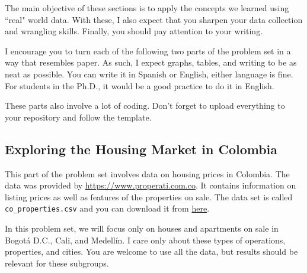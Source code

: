 \documentclass[12pt,onecolumn]{article}
\begin{document}
The main objective of these sections is to apply the concepts we learned using ``real" world data. With these, I also expect that you sharpen your data collection and wrangling skills. Finally, you should pay attention to your writing.

I encourage you to turn each of the following two parts of the problem set in a way that resembles paper. As such, I expect graphs, tables, and writing to be as neat as possible. You can write it in Spanish or English, either language is fine. For students in the Ph.D., it would be a good practice to do it in English.

These parts also involve a lot of coding. Don't forget to upload everything to your repository and follow the template. 

\subsection{Exploring the Housing Market in Colombia}

This part of the problem set involves data on housing prices in Colombia. The data was provided by \url{https://www.properati.com.co}. It contains information on listing prices as well as features of the properties on sale. The data set is called \texttt{co\_properties.csv} and you can download it from \href{https://www.dropbox.com/s/7za955mzf7b7qti/co_properties.zip?dl=0}{here}. 


In this problem set, we will focus only on houses and apartments on sale in Bogotá D.C., Cali, and Medellín. I care only about these types of operations, properties, and cities. You are welcome to use all the data, but results should be relevant for these subgroups.
\end{document}
